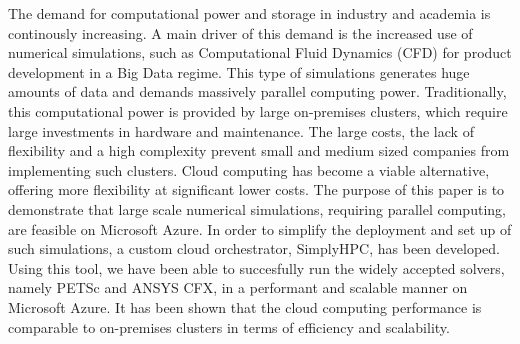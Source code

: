 The demand for computational power and storage in industry and academia is continously increasing. A main driver of this demand is the increased use of numerical simulations, such as Computational Fluid Dynamics (CFD) for product development in a Big Data regime. This type of simulations generates huge amounts of data and demands massively parallel computing power. Traditionally, this computational power is provided by large on-premises clusters, which require large investments in hardware and maintenance. The large costs, the lack of flexibility and a high complexity prevent small and medium sized companies from implementing such clusters. Cloud computing has become a viable alternative, offering more flexibility at significant lower costs. The purpose of this paper is to demonstrate that large scale numerical simulations, requiring parallel computing, are feasible on Microsoft Azure. In order to simplify the deployment and set up of such simulations, a custom cloud orchestrator, SimplyHPC, has been developed. Using this tool, we have been able to succesfully run the widely accepted solvers, namely PETSc and ANSYS CFX, in a performant and scalable manner on Microsoft Azure. It has been shown that the cloud computing performance is comparable to on-premises clusters in terms of efficiency and scalability. 
